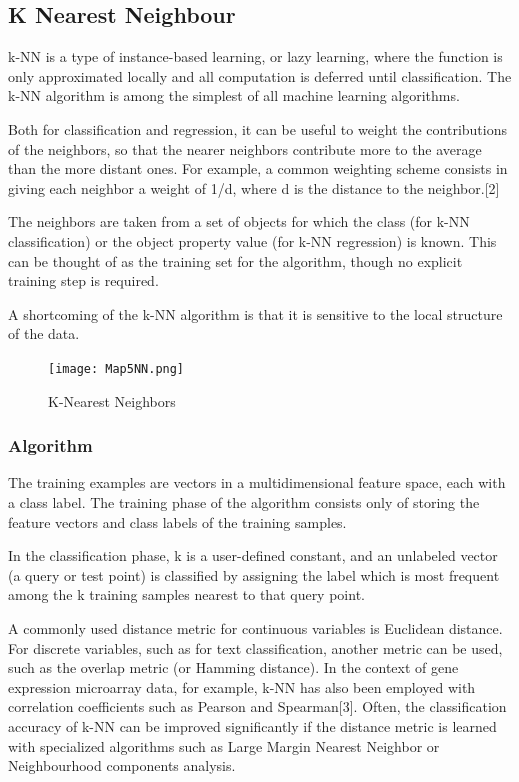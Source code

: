 \documentclass[12pt]{book}
\begin{document}
\subsection{K Nearest Neighbour}
k-NN is a type of instance-based learning, or lazy learning, where the function is only approximated locally and all computation is deferred until classification. The k-NN algorithm is among the simplest of all machine learning algorithms.

Both for classification and regression, it can be useful to weight the contributions of the neighbors, so that the nearer neighbors contribute more to the average than the more distant ones. For example, a common weighting scheme consists in giving each neighbor a weight of 1/d, where d is the distance to the neighbor.[2]

The neighbors are taken from a set of objects for which the class (for k-NN classification) or the object property value (for k-NN regression) is known. This can be thought of as the training set for the algorithm, though no explicit training step is required.

A shortcoming of the k-NN algorithm is that it is sensitive to the local structure of the data.

\begin{figure}[H]
\centering
\texttt{[image: Map5NN.png]}
\caption{K-Nearest Neighbors\cite{wikipedia-knn}}
\label{fig:figure4}
\end{figure}



\subsubsection{Algorithm}
The training examples are vectors in a multidimensional feature space, each with a class label. The training phase of the algorithm consists only of storing the feature vectors and class labels of the training samples.

In the classification phase, k is a user-defined constant, and an unlabeled vector (a query or test point) is classified by assigning the label which is most frequent among the k training samples nearest to that query point.

A commonly used distance metric for continuous variables is Euclidean distance. For discrete variables, such as for text classification, another metric can be used, such as the overlap metric (or Hamming distance). In the context of gene expression microarray data, for example, k-NN has also been employed with correlation coefficients such as Pearson and Spearman[3]. Often, the classification accuracy of k-NN can be improved significantly if the distance metric is learned with specialized algorithms such as Large Margin Nearest Neighbor or Neighbourhood components analysis.
\end{document}
